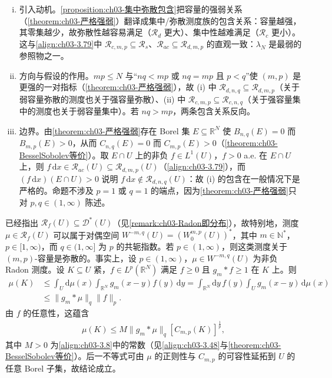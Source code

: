 \documentclass[../../main.tex]{subfiles}%
\begin{document}
\begin{remark}\label{remark:ch03-包含关系动机}
\begin{enumerate}[(i)]
\item 引入动机。\cref{proposition:ch03-集中弥散包含}把容量的强弱关系（\cref{theorem:ch03-严格强弱}）翻译成集中/弥散测度族的包含关系：容量越强，其零集越少，故弥散性越容易满足（$\mathscr{R}_{d}$ 更大）、集中性越难满足（$\mathscr{R}_{c}$ 更小）。这与\eqref{align:ch03-3.79}中 $\mathscr{R}_{c,m,p}\subseteq\mathscr{R}_s$、$\mathscr{R}_{ac}\subseteq\mathscr{R}_{d,m,p}$ 的直观一致：$\lambda_N$ 是最弱的参照物之一。
\item 方向与假设的作用。$mp\leqslant N$ 与“$nq<mp$ 或 $nq=mp$ 且 $p<q$”使 $(m,p)$ 是更强的一对指标（\cref{theorem:ch03-严格强弱}），故 (i) 中 $\mathscr{R}_{d,n,q}\subseteq\mathscr{R}_{d,m,p}$（关于弱容量弥散的测度也关于强容量弥散）、(ii) 中 $\mathscr{R}_{c,m,p}\subseteq\mathscr{R}_{c,n,q}$（关于强容量集中的测度也关于弱容量集中）。若 $nq>mp$，两条包含关系反向。
\item 边界。由\cref{theorem:ch03-严格强弱}存在 Borel 集 $E\subseteq\mathbb{R}^N$ 使 $B_{n,q}(E)=0$ 而 $B_{m,p}(E)>0$，从而 $C_{n,q}(E)=0$ 而 $C_{m,p}(E)>0$（\cref{theorem:ch03-BesselSobolev等价}）。取 $E\cap U$ 上的非负 $f\in L^1(U)$，$f>0$ a.e. 在 $E\cap U$ 上，则 $f\,\mathrm{d}x\in\mathscr{R}_{ac}(U)\subseteq\mathscr{R}_{d,m,p}(U)$（\eqref{align:ch03-3.79}），而 $(f\,\mathrm{d}x)(E\cap U)>0$ 说明 $f\,\mathrm{d}x\notin\mathscr{R}_{d,n,q}(U)$：故 (i) 的包含在一般情况下是严格的。命题不涉及 $p=1$ 或 $q=1$ 的端点，因为\cref{theorem:ch03-严格强弱}只对 $p,q\in(1,\infty)$ 陈述。
\end{enumerate}
\end{remark}

已经指出 $\mathscr{R}_f(U)\subseteq\mathcal{D}^*(U)$（见\cref{remark:ch03-Radon即分布}），故特别地，测度 $\mu\in\mathscr{R}_f(U)$ 可以属于对偶空间 $W^{-m,q}(U)=(W^{m,p}_0(U))^*$，其中 $m\in\mathbb{N}^*$，$p\in[1,\infty)$，而 $q\in(1,\infty]$ 为 $p$ 的共轭指数。若 $p\in(1,\infty)$，则这类测度关于 $(m,p)$-容量是弥散的。事实上，设 $p\in(1,\infty)$，$\mu\in W^{-m,q}(U)$ 为非负 Radon 测度。设 $K\subseteq U$ 紧，$f\in L^p(\mathbb{R}^N)$ 满足 $f\geqslant0$ 且 $g_m*f\geqslant1$ 在 $K$ 上。则
\begin{align*}
\mu(K)&\leqslant\int_U\mathrm{d}\mu(x)\int_{\mathbb{R}^N}g_m(x-y)f(y)\,\mathrm{d}y
=\int_{\mathbb{R}^N}\mathrm{d}y\,f(y)\int_U g_m(x-y)\,\mathrm{d}\mu(x)\\
&\leqslant\|g_m*\mu\|_q\|f\|_p.
\end{align*}
由 $f$ 的任意性，这蕴含
\begin{align*}
\mu(K)\leqslant M\|g_m*\mu\|_q[C_{m,p}(K)]^{\frac1p},
\end{align*}
其中 $M>0$ 为\eqref{align:ch03-3.8}中的常数（见\eqref{align:ch03-3.48}与\cref{theorem:ch03-BesselSobolev等价}）。后一不等式可由 $\mu$ 的正则性与 $C_{m,p}$ 的可容性延拓到 $U$ 的任意 Borel 子集，故结论成立。
\end{document}
